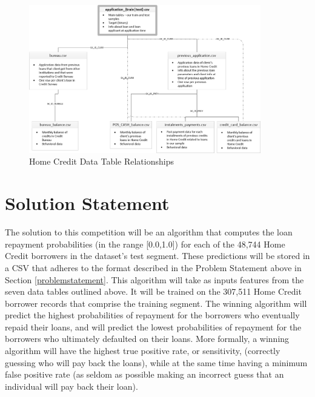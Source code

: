 \documentclass[12pt, letterpaper]{article}
\begin{document}
\begin{figure}[ht]
\includegraphics[width=0.9\textwidth]{homecredit}
\centering
\caption{Home Credit Data Table Relationships\cite{kagglehomecreditcompetitiondata}}
\end{figure}

\section{Solution Statement}
The solution to this competition will be an algorithm that computes the loan repayment probabilities (in the range [0.0,1.0]) for each of the 48,744 Home Credit borrowers in the dataset's test segment. These predictions will be stored in a CSV that adheres to the format described in the Problem Statement above in Section \ref{problemstatement}. This algorithm will take as inputs features from the seven data tables outlined above. It will be trained on the 307,511 Home Credit borrower records that comprise the training segment. The winning algorithm will predict the highest probabilities of repayment for the borrowers who eventually repaid their loans, and will predict the lowest probabilities of repayment for the borrowers who ultimately defaulted on their loans. More formally, a winning algorithm will have the highest true positive rate, or sensitivity, (correctly guessing who will pay back the loans), while at the same time having a minimum false positive rate (as seldom as possible making an incorrect guess that an individual will pay back their loan).
\end{document}
